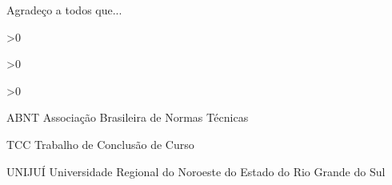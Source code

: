 \documentclass[
    12pt,               %
    oneside,            %
    a4paper,            %
    chapter=TITLE,      %
    section=TITLE,      %
    english,            %
    brazil,             %
    article             %
]{abntex2}
\begin{document}

\frenchspacing


\pretextual

\imprimircapa

\imprimirfolhaderosto

%     

\imprimirfolhadabanca

\begin{agradecimentos}
    Agradeço a todos que...
\end{agradecimentos}
\newpage

\begin{epigrafe}
\end{epigrafe}
\newpage

\ifnum{}>0
    \listoffigures*
    \cleardoublepage
    \newpage
\fi

\ifnum{}>0
    \listofquadros*
    \cleardoublepage
    \newpage
\fi

\ifnum{}>0
    \listoftables*
    \cleardoublepage
    \newpage
\fi

\begin{siglas}
    \item[ABNT] Associação Brasileira de Normas Técnicas
    \item[TCC] Trabalho de Conclusão de Curso
    \item[UNIJUÍ] Universidade Regional do Noroeste do Estado do Rio Grande do Sul
\end{siglas}
\end{document}
